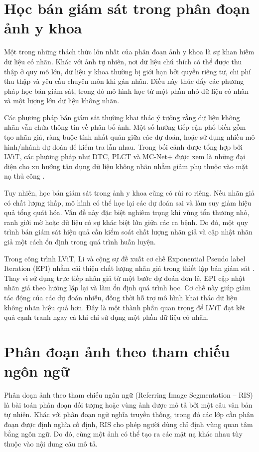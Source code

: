\section{Học bán giám sát trong phân đoạn ảnh y khoa}

Một trong những thách thức lớn nhất của phân đoạn ảnh y khoa là sự khan hiếm dữ liệu có nhãn. Khác với ảnh tự nhiên, nơi dữ liệu chú thích có thể được thu thập ở quy mô lớn, dữ liệu y khoa thường bị giới hạn bởi quyền riêng tư, chi phí thu thập và yêu cầu chuyên môn khi gán nhãn. Điều này thúc đẩy các phương pháp học bán giám sát, trong đó mô hình học từ một phần nhỏ dữ liệu có nhãn và một lượng lớn dữ liệu không nhãn.

Các phương pháp bán giám sát thường khai thác ý tưởng rằng dữ liệu không nhãn vẫn chứa thông tin về phân bố ảnh. Một số hướng tiếp cận phổ biến gồm tạo nhãn giả, ràng buộc tính nhất quán giữa các dự đoán, hoặc sử dụng nhiều mô hình/nhánh dự đoán để kiểm tra lẫn nhau. Trong bối cảnh được tổng hợp bởi LViT, các phương pháp như DTC, PLCT và MC-Net+ được xem là những đại diện cho xu hướng tận dụng dữ liệu không nhãn nhằm giảm phụ thuộc vào mặt nạ thủ công \cite{li_lvit_2023}.

Tuy nhiên, học bán giám sát trong ảnh y khoa cũng có rủi ro riêng. Nếu nhãn giả có chất lượng thấp, mô hình có thể học lại các dự đoán sai và làm suy giảm hiệu quả tổng quát hóa. Vấn đề này đặc biệt nghiêm trọng khi vùng tổn thương nhỏ, ranh giới mờ hoặc dữ liệu có sự khác biệt lớn giữa các ca bệnh. Do đó, một quy trình bán giám sát hiệu quả cần kiểm soát chất lượng nhãn giả và cập nhật nhãn giả một cách ổn định trong quá trình huấn luyện.

Trong công trình LViT, Li và cộng sự đề xuất cơ chế Exponential Pseudo label Iteration (EPI) nhằm cải thiện chất lượng nhãn giả trong thiết lập bán giám sát \cite{li_lvit_2023}. Thay vì sử dụng trực tiếp nhãn giả từ một bước dự đoán đơn lẻ, EPI cập nhật nhãn giả theo hướng lặp lại và làm ổn định quá trình học. Cơ chế này giúp giảm tác động của các dự đoán nhiễu, đồng thời hỗ trợ mô hình khai thác dữ liệu không nhãn hiệu quả hơn. Đây là một thành phần quan trọng để LViT đạt kết quả cạnh tranh ngay cả khi chỉ sử dụng một phần dữ liệu có nhãn.

\section{Phân đoạn ảnh theo tham chiếu ngôn ngữ}

Phân đoạn ảnh theo tham chiếu ngôn ngữ (Referring Image Segmentation -- RIS) là bài toán phân đoạn đối tượng hoặc vùng ảnh được mô tả bởi một câu văn bản tự nhiên. Khác với phân đoạn ngữ nghĩa truyền thống, trong đó các lớp cần phân đoạn được định nghĩa cố định, RIS cho phép người dùng chỉ định vùng quan tâm bằng ngôn ngữ. Do đó, cùng một ảnh có thể tạo ra các mặt nạ khác nhau tùy thuộc vào nội dung câu mô tả.

